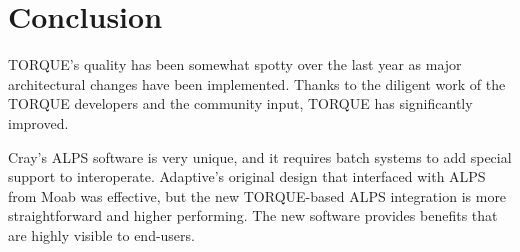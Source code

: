 \section{Conclusion}

TORQUE's quality has been somewhat spotty over the last year as major
architectural changes have been implemented.  Thanks to the diligent work of
the TORQUE developers and the community input, TORQUE has significantly
improved.

Cray's ALPS software is very unique, and it requires batch systems to add
special support to interoperate.  Adaptive's original design that interfaced
with ALPS from Moab was effective, but the new TORQUE-based ALPS integration is
more straightforward and higher performing.  The new software provides benefits
that are highly visible to end-users.
